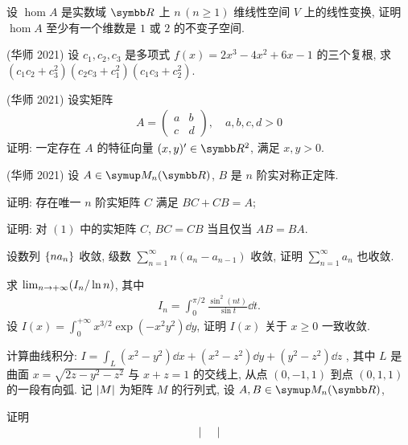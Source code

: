 \begin{exercise}[resume=exer]
        \item  设 $ \hom{A} $ 是实数域 $ \R $ 上 $ n\,(n\ge 1) $ 维线性空间 $ V $ 上的线性变换, 证明 $ \hom{A} $ 至少有一个维数是 $ 1 $ 或 $ 2 $ 的不变子空间.
        \item (华师 2021) 设 $ c_{1}, c_{2}, c_{3} $ 是多项式 $ f(x) = 2x^{3} - 4x^{2} + 6x - 1 $ 的三个复根, 求 $ (c_{1}c_{2} + c_{3}^{2})(c_{2}c_{3} + c_{1}^{2})(c_{1}c_{3} + c_{2}^{2}) $.
        \item (华师 2021) 设实矩阵
        \begin{align*}
            A = \begin{pmatrix}
                a & b \\ c & d
            \end{pmatrix},\quad a, b, c, d > 0
        \end{align*}
        证明: 一定存在 $ A $ 的特征向量 $ (x, y)'\in \R^{2} $, 满足 $ x, y > 0 $.
        \item (华师 2021) 设 $ A \in \MM $, $ B $ 是 $ n $ 阶实对称正定阵. 
        \begin{exercise}
            \item 证明: 存在唯一 $ n $ 阶实矩阵 $ C $ 满足 $ BC + CB = A $;
            \item 证明: 对 $ (1) $ 中的实矩阵 $ C $, $ BC = CB $ 当且仅当 $ AB = BA $. 
        \end{exercise}
        \item 设数列 $ \qty{na_{n}} $ 收敛, 级数 $ \sum_{n=1}^{\infty}n(a_{n} - a_{n-1}) $ 收敛, 证明 $ \sum_{n=1}^{\infty}a_{n} $ 也收敛. 
        \item 求 $ \lim_{n \to +\infty} (I_{n}/\ln n) $, 其中
        \begin{align*}
            I_{n} = \int_{0}^{\pi/2} \frac{\sin^{2}(nt)}{\sin t}\dd{t}.
        \end{align*}
        \sitem 设 $ I(x) = \int_{0}^{+\infty} x^{3/2}\exp(-x^{2}y^{2})\dd{y} $, 证明 $ I(x) $ 关于 $ x\geq 0 $ 一致收敛.
        \item 计算曲线积分: $ I = \int_{L} (x^{2} - y^{2}) \dd{x} + (x^{2} - z^{2}) \dd{y} + (y^{2} - z^{2})\dd{z} $ , 其中 $ L $ 是曲面 $ x = \sqrt{2z - y^{2} - z^{2}} $ 与 $ x + z = 1 $ 的交线上, 从点 $ (0, -1, 1) $ 到点 $ (0, 1, 1) $ 的一段有向弧.
        \sitem 记 $ \abs{M} $ 为矩阵 $ M $ 的行列式, 设 $ A, B\in \MM $, 
        \begin{exercise}
            \item 证明
            \begin{align*}
                \begin{vmatrix}

\end{vmatrix}
\end{align*}
\end{exercise}
\end{exercise}

